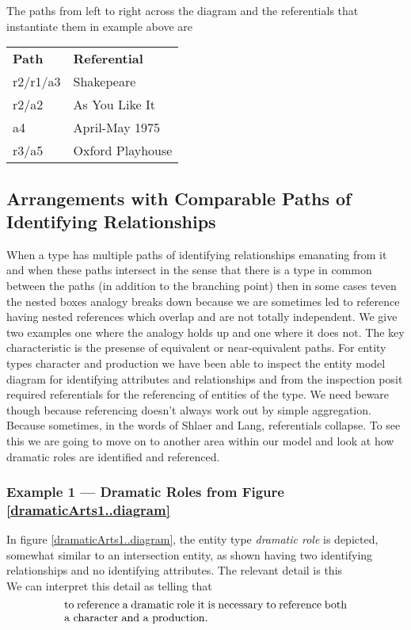 The paths from left to right across the diagram and the referentials that instantiate them in example above are\\
\newline
\begin{tabular}{l l}
\textbf{Path}     & \textbf{Referential} \\
r2/r1/a3 & Shakepeare       \\
r2/a2    & As You Like It   \\
a4       & April-May 1975   \\
r3/a5    & Oxford Playhouse
\end{tabular}

\subsection{Arrangements with Comparable Paths of Identifying Relationships}
When a type has multiple paths of identifying relationships emanating from it and when these paths intersect in the sense that there is a type in common between the paths (in addition to the
branching point) then in some cases teven the nested boxes analogy breaks down
because we are sometimes led to reference having nested references which overlap and are not totally independent. We give two examples one where the analogy holds up and one where it does not. The key characteristic is the presense of equivalent or near-equivalent paths.
For entity types character and production we have been able to inspect the entity model diagram for identifying  attributes and relationships and from the inspection posit required referentials  for the referencing of entities of the type.
We need beware though because referencing doesn't always work out by simple aggregation. Because sometimes,
in the words of Shlaer and Lang, referentials collapse. 
To see this we are going to move on to another area within our model and look at how dramatic roles are identified and referenced.

 \subsubsection{Example 1 --- Dramatic Roles from Figure \ref{dramaticArts1..diagram}}
\mynote
In figure \ref{dramaticArts1..diagram}, the entity type \textit{dramatic role} is
depicted, somewhat similar to an intersection entity, as shown having
two identifying relationships and no identifying attributes.
The relevant detail is  this
\begin{equation*}

\end{equation*}
We can interpret this detail as telling that
\begin{equation}
\label{DramaticRoleReferencing}
\text{\parbox{9cm}{to reference a dramatic role it is necessary  
to reference both a character and  a production.}}
\end{equation}

